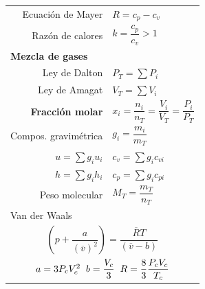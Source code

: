 \documentclass[11pt,a4paper,twocolumn]{article}
\begin{document}
	\begin{tcolorbox}[colback=white!97!brown, colframe=brown!15!gray]
		
		
		
		\begin{tabular}{r l}
			\vspace{.1cm}	Ecuación de Mayer 		& $R=c_{p}-c_{v}$ \\
			\vspace{.2cm}			Razón de calores 			& $k = \dfrac{c_{p}}{c_{v}}>1$ \\
			\multicolumn{2}{l}{\textbf{Mezcla de gases}} \\
			\vspace{.1cm}	Ley de Dalton 			& $P_{T}=\displaystyle\sum P_{i}$ \\
			\vspace{.1cm}Ley de Amagat 				& $V_{T}=\displaystyle\sum V_{i}$ \\
			
			\vspace{.1cm}\textbf{Fracción molar} & $x_{i}=\dfrac{n_{i}}{n_{T}}=\dfrac{V_{i}}{V_{T}}=\dfrac{P_{i}}{P_{T}}$\\
			\vspace{.1cm} Compos. gravimétrica & $g_{i}=\dfrac{m_{i}}{m_{T}}$\\
			                                                                 
			\vspace{.1cm} $u=\sum g_{i}u_{i}$ 		&$c_{v}= \sum g_{i}c_{vi}$\\
			\vspace{.2cm} $h=\sum g_{i}h_{i}$ 		&$c_{p}=\sum g_{i}c_{pi}$\\
			\vspace{.2cm} Peso molecular & $M_T=\dfrac{m_T}{n_T}$ \\
			
			\multicolumn{2}{l}{\vspace{.1cm}	Van der Waals } \\
			\multicolumn{2}{c}{$\left( p+\dfrac{a}{(\overline{v})^{2}} \right)=\dfrac{\overline{R}T}{(\overline{v}-b)}$} \\
			\multicolumn{2}{c}{\vspace{.2cm} $a=3P_{c} V_{c}^{2} \hspace{.2cm} b=\dfrac{V_{c}}{3} \hspace{.2cm} R=\dfrac{8}{3}\dfrac{P_{c}V_{c}}{T_{c}}$ } \\
			

\end{tabular}
\end{tcolorbox}
\end{document}
